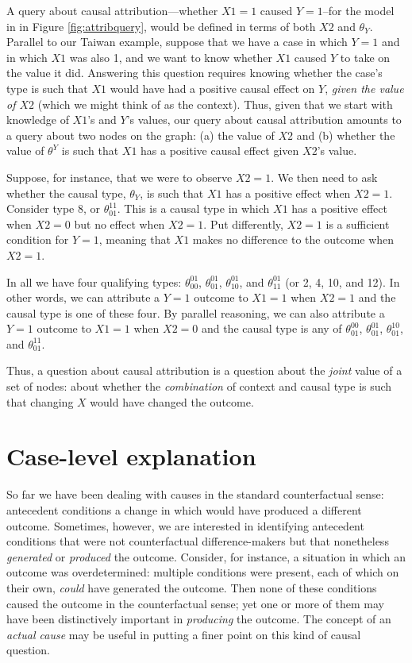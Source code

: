 \documentclass[12pt,]{book}
\begin{document}
A query about causal attribution---whether \(X1 = 1\) caused \(Y=1\)--for the model in in Figure \ref{fig:attribquery}, would be defined in terms of both \(X2\) and \(\theta_Y\). Parallel to our Taiwan example, suppose that we have a case in which \(Y=1\) and in which \(X1\) was also 1, and we want to know whether \(X1\) caused \(Y\) to take on the value it did. Answering this question requires knowing whether the case's type is such that \(X1\) would have had a positive causal effect on \(Y\), \emph{given the value of \(X2\)} (which we might think of as the context). Thus, given that we start with knowledge of \(X1\)'s and \(Y\)'s values, our query about causal attribution amounts to a query about two nodes on the graph: (a) the value of \(X2\) and (b) whether the value of \(\theta^Y\) is such that \(X1\) has a positive causal effect given \(X2\)'s value.

Suppose, for instance, that we were to observe \(X2=1\). We then need to ask whether the causal type, \(\theta_Y\), is such that \(X1\) has a positive effect when \(X2=1\). Consider type 8, or \(\theta_{01}^{11}\). This is a causal type in which \(X1\) has a positive effect when \(X2=0\) but no effect when \(X2=1\). Put differently, \(X2=1\) is a sufficient condition for \(Y=1\), meaning that \(X1\) makes no difference to the outcome when \(X2=1\).

In all we have four qualifying types: \(\theta_{00}^{01}\), \(\theta_{01}^{01}\), \(\theta_{10}^{01}\), and \(\theta_{11}^{01}\) (or 2, 4, 10, and 12). In other words, we can attribute a \(Y=1\) outcome to \(X1=1\) when \(X2=1\) and the causal type is one of these four. By parallel reasoning, we can also attribute a \(Y=1\) outcome to \(X1=1\) when \(X2=0\) and the causal type is any of \(\theta_{01}^{00}\), \(\theta_{01}^{01}\), \(\theta_{01}^{10}\), and \(\theta_{01}^{11}\).

Thus, a question about causal attribution is a question about the \emph{joint} value of a set of nodes: about whether the \emph{combination} of context and causal type is such that changing \(X\) would have changed the outcome.

\hypertarget{case-level-explanation}{%
\section{Case-level explanation}\label{case-level-explanation}}

So far we have been dealing with causes in the standard counterfactual sense: antecedent conditions a change in which would have produced a different outcome. Sometimes, however, we are interested in identifying antecedent conditions that were not counterfactual difference-makers but that nonetheless \emph{generated} or \emph{produced} the outcome. Consider, for instance, a situation in which an outcome was overdetermined: multiple conditions were present, each of which on their own, \emph{could} have generated the outcome. Then none of these conditions caused the outcome in the counterfactual sense; yet one or more of them may have been distinctively important in \emph{producing} the outcome. The concept of an \emph{actual cause} may be useful in putting a finer point on this kind of causal question.
\end{document}
